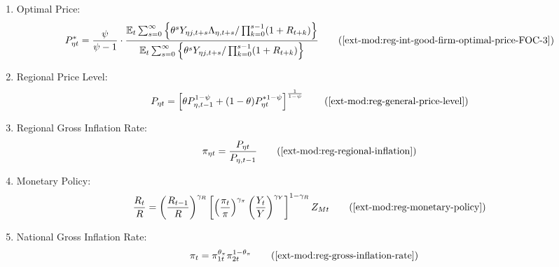 \documentclass[../thesis.tex]{subfiles}
\begin{document}
{\begin{itemize}
\begin{enumerate}
		\item Optimal Price:
		\begin{align}
			P_{\eta t}^{\ast} = \frac{\psi}{\psi-1} \cdot \frac{ \E \sum_{s=0}^{\infty} \left\{ \theta^s Y_{\eta j,t+s} \Lambda_{\eta, t+s} / \prod_{k=0}^{s-1}(1+R_{t+k}) \right\}} {\E \sum_{s=0}^{\infty} \left\{ \theta^s Y_{\eta j,t+s} / \prod_{k=0}^{s-1}(1 + R_{t+k}) \right\}} \tag{\ref{ext-mod:reg-int-good-firm-optimal-price-FOC-3}}
		\end{align}
		
		\item Regional Price Level:
		\begin{align}
			P_{\eta t} = \left[ \theta P_{\eta,t-1}^{1-\psi} + (1-\theta) P_{\eta t}^{\ast 1-\psi} \right]^\frac{1}{1-\psi} \tag{\ref{ext-mod:reg-general-price-level}}
		\end{align}
		
		\item Regional Gross Inflation Rate:
		\begin{align}
			\pi_{\eta t} = \frac{P_{\eta t}}{P_{\eta, t-1}} \tag{\ref{ext-mod:reg-regional-inflation}}
		\end{align}
		
		\begin{comment}
			\item Intermediate-goods Firms Profit:
			\begin{align}
				\Pi_{\eta t} &= \int_{0}^{1} P_{\eta t} Y_{\eta jt} - W_{\eta t} L_{\eta jt} \dif j \tag{\ref{ext-mod:reg-int-good-firm-profit-total-2}}
			\end{align}	
		\end{comment}
		
		\item Monetary Policy:
		\begin{align}
			\frac{R_{t}}{R} = \left( \frac{R_{t-1}}{R} \right)^{\gamma_{R}} \left[ \left( \frac{\pi_t}{\pi} \right)^{\gamma_{\pi}} \left( \frac{Y_{t}}{Y} \right)^{\gamma_{Y}} \right]^{1-\gamma_{R}} Z_{Mt} \tag{\ref{ext-mod:reg-monetary-policy}}
		\end{align}
		
		\item National Gross Inflation Rate:
		\begin{align}
			\pi_{t} &= \pi_{1t}^{\theta_{\pi}} \pi_{2t}^{1 - \theta_{\pi}} \tag{\ref{ext-mod:reg-gross-inflation-rate}}
		\end{align}
		

\end{enumerate}
\end{itemize}}
\end{document}
